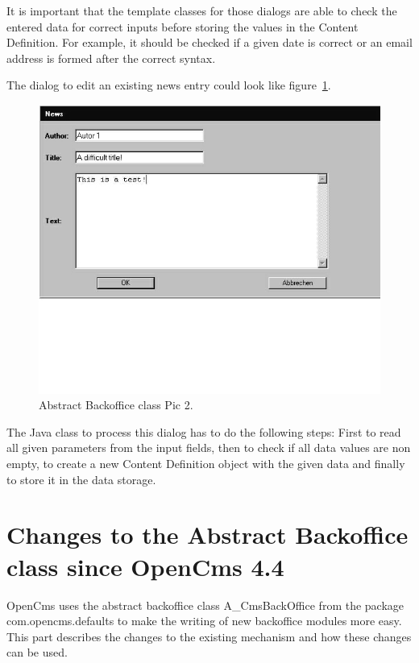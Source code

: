 It is important that the template classes for those dialogs are able to
check the entered data for correct inputs before storing the values in
the Content Definition. For example, it should be checked  if a given
date is correct or an email address is formed after the correct syntax.

The dialog to edit an existing news entry could look like figure~\ref{AbsrtactBO1}.

\begin{figure}
\begin{center}
\includegraphics[clip,width=\sgw]{pics/backOffice/new}
\end{center}
\caption[Abstract Backoffice class Pic 2]{Abstract Backoffice class Pic 2.}
\label{AbsrtactBO1}
\end{figure}

The Java class to process this dialog has to do the following steps:
First to read all given parameters from the input fields, then to check
if all data values are non empty,  to create a new Content Definition
object with the given data and finally to store it in the data storage.

\section{Changes to the Abstract Backoffice class since OpenCms 4.4}
OpenCms uses the abstract backoffice class {\name A\_CmsBackOffice} from the
package  \\
{\name com.opencms.defaults} to make the writing of new backoffice 
modules more easy. 
This part describes the changes to the existing mechanism and how these
changes can be used.

